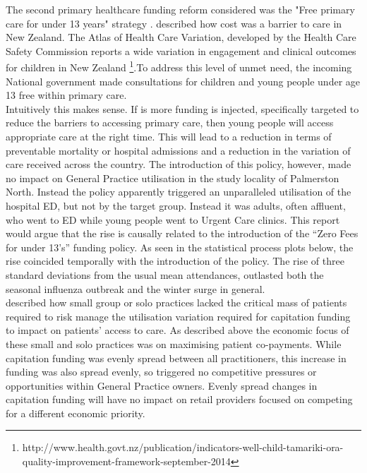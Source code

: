 \documentclass[11pt,a4paper]{article}
\begin{document}
The second primary healthcare funding reform considered was the "Free primary care for under 13 years" strategy \citep{frizelle2014health}. \citet{schoen2009survey} described how cost was a barrier to care in New Zealand. The Atlas of Health Care Variation, developed by the Health Care Safety Commission reports a wide variation in engagement and clinical outcomes for children in New Zealand \footnote{http://www.health.govt.nz/publication/indicators-well-child-tamariki-ora-quality-improvement-framework-september-2014}.To address this level of unmet need, the incoming National government made consultations for children and young people under age 13 free within primary care\citep{frizelle2014health}. \\


Intuitively this makes sense. If is more funding is injected, specifically targeted to reduce the barriers to accessing primary care, then young people will access appropriate care at the right time. This will lead to a reduction in terms of preventable mortality or hospital admissions and a reduction in the variation of care received across the country. The introduction of this policy, however,  made no impact on General Practice utilisation in the study locality of Palmerston North. Instead the policy apparently triggered an unparalleled utilisation of the hospital ED, but  not by  the target group. Instead it was adults, often affluent, who went to ED while young people went to Urgent Care clinics. This report would argue that the rise is causally related to the introduction of the “Zero Fees for under 13’s” funding policy. As seen in the statistical process plots below, the rise coincided temporally with the introduction of the policy. The rise of three standard deviations from the usual mean attendances, outlasted both the seasonal influenza outbreak and the winter surge in general.\\


\citet{howell2005restructuring} described how small group or solo practices lacked the critical mass of patients required to risk manage the utilisation variation required for capitation funding to impact on patients’ access to care. As described above the economic focus of these small and solo practices was on maximising patient co-payments. While capitation funding was evenly spread between all practitioners, this increase in funding was also spread evenly, so triggered no competitive pressures or opportunities within General Practice owners. Evenly spread changes in capitation funding will have no impact on retail providers focused on competing for a different economic priority.\\
\end{document}
